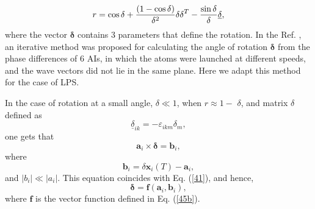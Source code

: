 \documentclass[twocolumn,showpacs,preprintnumbers]{revtex4}
\begin{document}
\begin{equation}
r=\cos \delta +\dfrac{\left( 1-\cos \delta \right) }{\delta ^{2}}\mathbf{%
\delta \delta }^{T}-\dfrac{\sin \delta }{\delta }\underline{\delta },
\label{49}
\end{equation}%
where the vector $\mathbf{\delta }$ contains 3 parameters that define the
rotation. In the Ref. \cite{c13}, an iterative method was proposed for
calculating the angle of rotation $\mathbf{\delta }$ from the phase
differences of $6$ AIs, in which the atoms were launched at different
speeds, and the wave vectors did not lie in the same plane. Here we adapt
this method for the case of LPS.

In the case of rotation at a small angle, $\delta \ll 1$, when $r\approx 1-$%
\underline{$\delta $}, and matrix $\delta $ defined as%
\begin{equation}
\underline{\delta }_{ik}=-\varepsilon _{ikm}\delta _{m},  \label{49.1}
\end{equation}%
one gets that%
\begin{equation}
\mathbf{a}_{i}\times \mathbf{\delta }=\mathbf{b}_{i},  \label{50}
\end{equation}%
where%
\begin{equation}
\mathbf{b}_{i}=\delta \mathbf{x}_{i}\left( T\right) -\mathbf{a}_{i},
\label{51}
\end{equation}%
and $\left\vert b_{i}\right\vert \ll \left\vert a_{i}\right\vert $. This
equation coincides with Eq. (\ref{41}), and hence,%
\begin{equation}
\mathbf{\delta }=\mathbf{f}\left( \mathbf{a}_{i},\mathbf{b}_{i}\right) ,
\label{52}
\end{equation}%
where $\mathbf{f}$ is the vector function defined in Eq. (\ref{45b}).
\end{document}
